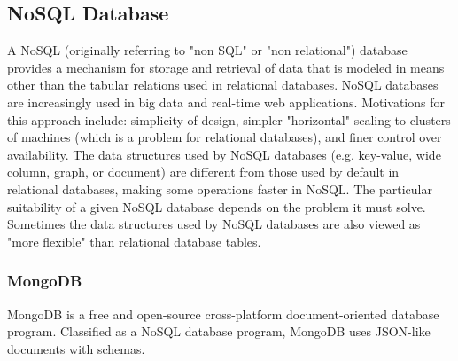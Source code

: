 \subsection{NoSQL Database}
A NoSQL (originally referring to "non SQL" or "non relational") database provides a mechanism for storage and retrieval of data that is modeled in means other than the tabular relations used in relational databases. NoSQL databases are increasingly used in big data and real-time web applications. Motivations for this approach include: simplicity of design, simpler "horizontal" scaling to clusters of machines (which is a problem for relational databases), and finer control over availability. The data structures used by NoSQL databases (e.g. key-value, wide column, graph, or document) are different from those used by default in relational databases, making some operations faster in NoSQL. The particular suitability of a given NoSQL database depends on the problem it must solve. Sometimes the data structures used by NoSQL databases are also viewed as "more flexible" than relational database tables.

\subsubsection{MongoDB}
MongoDB is a free and open-source cross-platform document-oriented database program. Classified as a NoSQL database program, MongoDB uses JSON-like documents with schemas.


